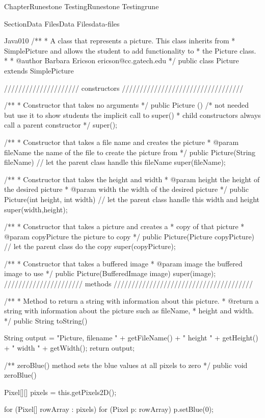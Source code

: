 \documentclass[oneside,10pt,]{book}
\numberwithin{equation}{section}
\begin{document}
\begin{chapterptx}{Chapter}{Runestone Testing}{}{Runestone Testing}{}{}{rune}
\begin{sectionptx}{Section}{Data Files}{}{Data Files}{}{}{data-files}
\begin{program}{Java}{0}{1}{0}
/**
 * A class that represents a picture.  This class inherits from
 * SimplePicture and allows the student to add functionality to
 * the Picture class.
 *
 * @author Barbara Ericson ericson@cc.gatech.edu
 */
public class Picture extends SimplePicture
{
  ///////////////////// constructors //////////////////////////////////

  /**
   * Constructor that takes no arguments
   */
  public Picture ()
  {
    /* not needed but use it to show students the implicit call to super()
     * child constructors always call a parent constructor
     */
    super();
  }

  /**
   * Constructor that takes a file name and creates the picture
   * @param fileName the name of the file to create the picture from
   */
  public Picture(String fileName)
  {
    // let the parent class handle this fileName
    super(fileName);
  }

  /**
   * Constructor that takes the height and width
   * @param height the height of the desired picture
   * @param width the width of the desired picture
   */
  public Picture(int height, int width)
  {
    // let the parent class handle this width and height
    super(width,height);
  }

  /**
   * Constructor that takes a picture and creates a
   * copy of that picture
   * @param copyPicture the picture to copy
   */
  public Picture(Picture copyPicture)
  {
    // let the parent class do the copy
    super(copyPicture);
  }

  /**
   * Constructor that takes a buffered image
   * @param image the buffered image to use
   */
  public Picture(BufferedImage image)
  {
    super(image);
  }
  ////////////////////// methods ///////////////////////////////////////

  /**
   * Method to return a string with information about this picture.
   * @return a string with information about the picture such as fileName,
   * height and width.
   */
  public String toString()
  {
    String output = "Picture, filename " + getFileName() +
      " height " + getHeight()
      + " width " + getWidth();
    return output;

  }

  /**
    zeroBlue() method sets the blue values at all pixels to zero
 */
  public void zeroBlue()
  {
    Pixel[][] pixels = this.getPixels2D();

    for (Pixel[] rowArray : pixels)
     {
       for (Pixel p: rowArray)
       {
              p.setBlue(0);
       }
    }
  }


}
\end{program}
\end{sectionptx}
\end{chapterptx}
\end{document}
